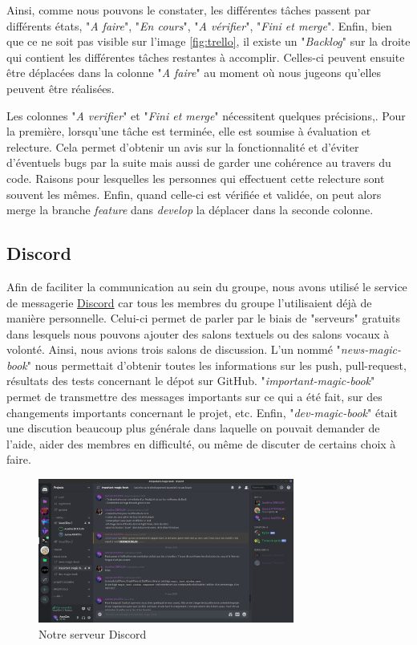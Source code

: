 			Ainsi, comme nous pouvons le constater, les différentes tâches passent par différents états, "\textit{A faire}", "\textit{En cours}", "\textit{A vérifier}", "\textit{Fini et merge}". Enfin, bien que ce ne soit pas visible sur l'image \ref{fig:trello}, il existe un "\textit{Backlog}" sur la droite qui contient les différentes tâches restantes à accomplir. Celles-ci peuvent ensuite être déplacées dans la colonne "\textit{A faire}" au moment où nous jugeons qu'elles peuvent être réalisées.

			Les colonnes "\textit{A verifier}" et "\textit{Fini et merge}" nécessitent quelques précisions,. Pour la première, lorsqu'une tâche est terminée, elle est soumise à évaluation et relecture. Cela permet d'obtenir un avis sur la fonctionnalité et d'éviter d'éventuels bugs par la suite mais aussi de garder une cohérence au travers du code. Raisons pour lesquelles les personnes qui effectuent cette relecture sont souvent les mêmes. Enfin, quand celle-ci est vérifiée et validée, on peut alors merge la branche \textit{feature} dans \textit{develop} la déplacer dans la seconde colonne.

		\subsection{Discord}

			Afin de faciliter la communication au sein du groupe, nous avons utilisé le service de messagerie \href{https://discordapp.com}{Discord} car tous les membres du groupe l'utilisaient déjà de manière personnelle. Celui-ci permet de parler par le biais de "serveurs" gratuits dans lesquels nous pouvons ajouter des salons textuels ou des salons vocaux à volonté. Ainsi, nous avions trois salons de discussion. L'un nommé "\textit{news-magic-book}" nous permettait d'obtenir toutes les informations sur les push, pull-request, résultats des tests concernant le dépot sur GitHub. "\textit{important-magic-book}" permet de transmettre des messages importants sur ce qui a été fait, sur des changements importants concernant le projet, etc. Enfin, "\textit{dev-magic-book}" était une discution beaucoup plus générale dans laquelle on pouvait demander de l'aide, aider des membres en difficulté, ou même de discuter de certains choix à faire.

			\begin{figure}[H]
				\centering\includegraphics[width=0.75\textwidth, keepaspectratio]{img/discord.png}
				\caption{Notre serveur Discord}
			\end{figure}

